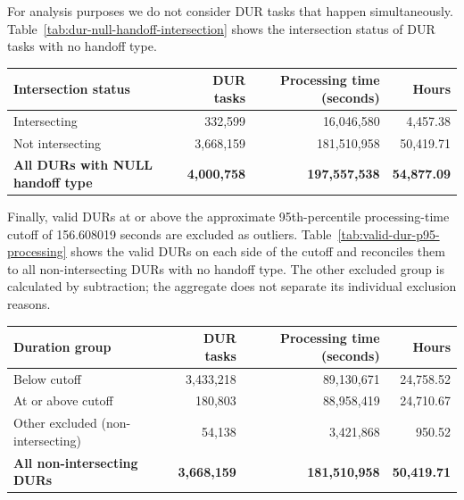 For analysis purposes we do not consider DUR tasks that happen simultaneously.
Table~\ref{tab:dur-null-handoff-intersection} shows the intersection status
of DUR tasks with no handoff type.

\begin{center}
\small
\begin{tabular}{@{}lrrr@{}}
\toprule
Intersection status & DUR tasks & Processing time (seconds) & Hours \\
\midrule
Intersecting & 332,599 & 16,046,580 & 4,457.38 \\
Not intersecting & 3,668,159 & 181,510,958 & 50,419.71 \\
\midrule
\textbf{All DURs with NULL handoff type} & \textbf{4,000,758} & \textbf{197,557,538} & \textbf{54,877.09} \\
\bottomrule
\end{tabular}
\label{tab:dur-null-handoff-intersection}
\end{center}


Finally, valid DURs at or above the approximate 95th-percentile
processing-time cutoff of 156.608019 seconds are excluded as outliers.
Table~\ref{tab:valid-dur-p95-processing} shows the valid DURs on each
side of the cutoff and reconciles them to all non-intersecting DURs with
no handoff type. The other excluded group is calculated by subtraction;
the aggregate does not separate its individual exclusion reasons.

\begin{center}
\small
\begin{tabular}{@{}lrrr@{}}
\toprule
Duration group & DUR tasks & Processing time (seconds) & Hours \\
\midrule
Below cutoff & 3,433,218 & 89,130,671 & 24,758.52 \\
At or above cutoff & 180,803 & 88,958,419 & 24,710.67 \\
Other excluded (non-intersecting) & 54,138 & 3,421,868 & 950.52 \\
\midrule
\textbf{All non-intersecting DURs} & \textbf{3,668,159} & \textbf{181,510,958} & \textbf{50,419.71} \\
\bottomrule
\end{tabular}
\label{tab:valid-dur-p95-processing}
\end{center}
